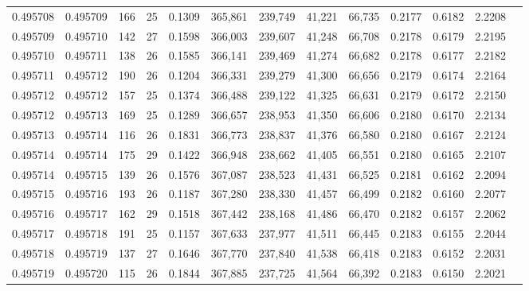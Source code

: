 \begin{tabular}{rrrrrrrrrrrrr}
0.495708 & 0.495709 & 166 &  25 &                                     0.1309 & 365,861 & 239,749 &  41,221 &  66,735 & 0.2177 & 0.6182 & 2.2208 \\
0.495709 & 0.495710 & 142 &  27 &                                     0.1598 & 366,003 & 239,607 &  41,248 &  66,708 & 0.2178 & 0.6179 & 2.2195 \\
0.495710 & 0.495711 & 138 &  26 &                                     0.1585 & 366,141 & 239,469 &  41,274 &  66,682 & 0.2178 & 0.6177 & 2.2182 \\
0.495711 & 0.495712 & 190 &  26 &                                     0.1204 & 366,331 & 239,279 &  41,300 &  66,656 & 0.2179 & 0.6174 & 2.2164 \\
0.495712 & 0.495712 & 157 &  25 &                                     0.1374 & 366,488 & 239,122 &  41,325 &  66,631 & 0.2179 & 0.6172 & 2.2150 \\
0.495712 & 0.495713 & 169 &  25 &                                     0.1289 & 366,657 & 238,953 &  41,350 &  66,606 & 0.2180 & 0.6170 & 2.2134 \\
0.495713 & 0.495714 & 116 &  26 &                                     0.1831 & 366,773 & 238,837 &  41,376 &  66,580 & 0.2180 & 0.6167 & 2.2124 \\
0.495714 & 0.495714 & 175 &  29 &                                     0.1422 & 366,948 & 238,662 &  41,405 &  66,551 & 0.2180 & 0.6165 & 2.2107 \\
0.495714 & 0.495715 & 139 &  26 &                                     0.1576 & 367,087 & 238,523 &  41,431 &  66,525 & 0.2181 & 0.6162 & 2.2094 \\
0.495715 & 0.495716 & 193 &  26 &                                     0.1187 & 367,280 & 238,330 &  41,457 &  66,499 & 0.2182 & 0.6160 & 2.2077 \\
0.495716 & 0.495717 & 162 &  29 &                                     0.1518 & 367,442 & 238,168 &  41,486 &  66,470 & 0.2182 & 0.6157 & 2.2062 \\
0.495717 & 0.495718 & 191 &  25 &                                     0.1157 & 367,633 & 237,977 &  41,511 &  66,445 & 0.2183 & 0.6155 & 2.2044 \\
0.495718 & 0.495719 & 137 &  27 &                                     0.1646 & 367,770 & 237,840 &  41,538 &  66,418 & 0.2183 & 0.6152 & 2.2031 \\
0.495719 & 0.495720 & 115 &  26 &                                     0.1844 & 367,885 & 237,725 &  41,564 &  66,392 & 0.2183 & 0.6150 & 2.2021 \\

\end{tabular}

